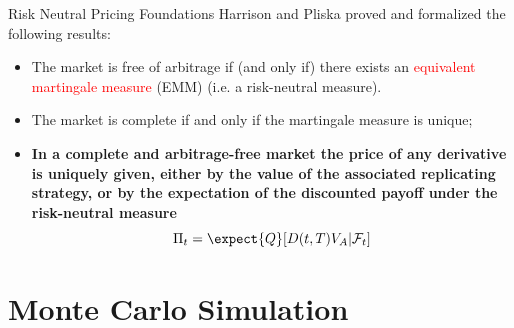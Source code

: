 \documentclass{beamer}
\begin{document}

\begin{frame}{Risk Neutral Pricing Foundations}
	Harrison and Pliska proved and formalized the following results:
	\begin{itemize}
		\item The market is free of arbitrage if (and only if) there exists an \textcolor{red}{equivalent martingale measure} (EMM) (i.e. a risk-neutral measure).
		\item The market is complete if and only if the martingale measure is unique;
		\item \textbf{In a complete and arbitrage-free market the price of any derivative is uniquely given, either by the value of the associated replicating strategy, or by the expectation of the discounted payoff under the risk-neutral measure}
		\begin{equation}
			\Pi_t = \expect{Q}[D(t,T)V_A|\mathcal{F}_t]
			\label{eq:risk_neutral_pricing}
		\end{equation}
	\end{itemize}
\end{frame}

\section{Monte Carlo Simulation}
\end{document}
